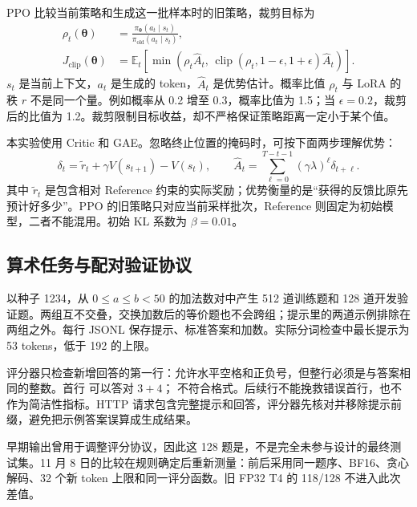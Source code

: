 PPO 比较当前策略和生成这一批样本时的旧策略，裁剪目标为\cite{ppo}
\begin{align}
\rho_t(\boldsymbol{\theta})
&=\frac{\pi_{\boldsymbol{\theta}}(a_t\mid s_t)}
{\pi_{\mathrm{old}}(a_t\mid s_t)},\\
J_{\mathrm{clip}}(\boldsymbol{\theta})
&=\mathbb E_t\!\left[
\min\!\left(\rho_t\widehat A_t,\,
\operatorname{clip}(\rho_t,1-\epsilon,1+\epsilon)\widehat A_t\right)\right].
\label{eq:ppo-zh}
\end{align}
$s_t$ 是当前上下文，$a_t$ 是生成的 token，$\widehat A_t$ 是优势估计。概率比值 $\rho_t$ 与 LoRA 的秩 $r$ 不是同一个量。例如概率从 0.2 增至 0.3，概率比值为 1.5；当 $\epsilon=0.2$，裁剪后的比值为 1.2。裁剪限制目标收益，却不严格保证策略距离一定小于某个值。

本实验使用 Critic 和 GAE。忽略终止位置的掩码时，可按下面两步理解优势：
\[
\delta_t=\widetilde r_t+\gamma V(s_{t+1})-V(s_t),\qquad
\widehat A_t=\sum_{\ell=0}^{T-t-1}(\gamma\lambda)^\ell\delta_{t+\ell}.
\]
其中 $\widetilde r_t$ 是包含相对 Reference 约束的实际奖励；优势衡量的是“获得的反馈比原先预计好多少”。PPO 的旧策略只对应当前采样批次，Reference 则固定为初始模型，二者不能混用。初始 KL 系数为 $\beta=0.01$。

\subsection{算术任务与配对验证协议}
 以种子 1234，从 $0\le a\le b<50$ 的加法数对中产生 512 道训练题和 128 道开发验证题。两组互不交叠，交换加数后的等价题也不会跨组；提示里的两道示例排除在两组之外。每行 JSONL 保存提示、标准答案和加数。实际分词检查中最长提示为 53 tokens，低于 192 的上限。

评分器只检查新增回答的第一行：允许水平空格和正负号，但整行必须是与答案相同的整数。首行  可以答对 $3+4$； 不符合格式。后续行不能挽救错误首行，也不作为简洁性指标。HTTP 请求包含完整提示和回答，评分器先核对并移除提示前缀，避免把示例答案误算成生成结果。

早期输出曾用于调整评分协议，因此这 128 题是，不是完全未参与设计的最终测试集。11 月 8 日的比较在规则确定后重新测量：前后采用同一题序、BF16、贪心解码、32 个新 token 上限和同一评分函数。旧 FP32 T4 的 118/128 不进入此次差值。

